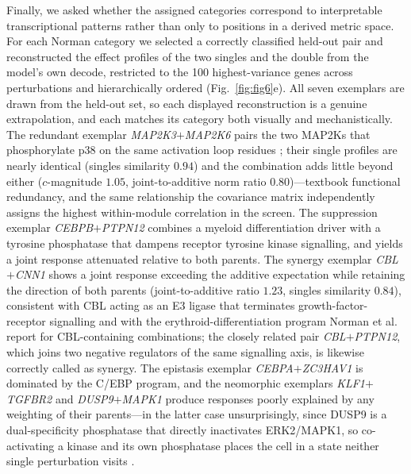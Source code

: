 Finally, we asked whether the assigned categories correspond to interpretable transcriptional
patterns rather than only to positions in a derived metric space. For each Norman category we
selected a correctly classified held-out pair and reconstructed the effect profiles of the two
singles and the double from the model's own decode, restricted to the 100 highest-variance genes
across perturbations and hierarchically ordered (Fig.~\ref{fig:fig6}e). All seven exemplars are drawn
from the held-out set, so each displayed reconstruction is a genuine extrapolation, and each matches
its category both visually and mechanistically. The redundant exemplar
\textit{MAP2K3}$+$\textit{MAP2K6} pairs the two MAP2Ks that phosphorylate p38 on the same activation
loop residues \cite{cuenda2007p38}; their single profiles are nearly identical (singles similarity
$0.94$) and the combination adds little beyond either ($c$-magnitude $1.05$, joint-to-additive norm
ratio $0.80$)---textbook functional redundancy, and the same relationship the covariance matrix
independently assigns the highest within-module correlation in the screen. The suppression exemplar
\textit{CEBPB}$+$\textit{PTPN12} combines a myeloid differentiation driver with a tyrosine phosphatase
that dampens receptor tyrosine kinase signalling, and yields a joint response attenuated relative to
both parents. The synergy exemplar \textit{CBL}$+$\textit{CNN1} shows a joint response exceeding the
additive expectation while retaining the direction of both parents (joint-to-additive ratio $1.23$,
singles similarity $0.84$), consistent with CBL acting as an E3 ligase that terminates
growth-factor-receptor signalling \cite{mohapatra2013cbl} and with the erythroid-differentiation
program Norman et al. report for CBL-containing combinations; the closely related pair
\textit{CBL}$+$\textit{PTPN12}, which joins two negative regulators of the same signalling axis, is
likewise correctly called as synergy. The epistasis exemplar
\textit{CEBPA}$+$\textit{ZC3HAV1} is dominated by the C/EBP program, and the neomorphic exemplars
\textit{KLF1}$+$\textit{TGFBR2} and \textit{DUSP9}$+$\textit{MAPK1} produce responses poorly explained
by any weighting of their parents---in the latter case unsurprisingly, since DUSP9 is a dual-specificity
phosphatase that directly inactivates ERK2/MAPK1, so co-activating a kinase and its own phosphatase
places the cell in a state neither single perturbation visits \cite{caunt2013dual}.

